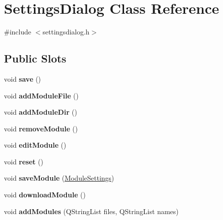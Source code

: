 \hypertarget{classSettingsDialog}{
\section{SettingsDialog Class Reference}
\label{classSettingsDialog}
}


{\ttfamily \#include $<$settingsdialog.h$>$}\subsection*{Public Slots}
\begin{DoxyCompactItemize}
\item 
\hypertarget{classSettingsDialog_adea5c3242cbad78dfc8d9948d2a265de}{
void {\bfseries save} ()}
\label{classSettingsDialog_adea5c3242cbad78dfc8d9948d2a265de}

\item 
\hypertarget{classSettingsDialog_a081503f4834e7a8ce54ac2d01f9b61b2}{
void {\bfseries addModuleFile} ()}
\label{classSettingsDialog_a081503f4834e7a8ce54ac2d01f9b61b2}

\item 
\hypertarget{classSettingsDialog_a5416feca0f8183ab304c5c484a2e69b1}{
void {\bfseries addModuleDir} ()}
\label{classSettingsDialog_a5416feca0f8183ab304c5c484a2e69b1}

\item 
\hypertarget{classSettingsDialog_ae27991e987832e86da7dc05621a9e400}{
void {\bfseries removeModule} ()}
\label{classSettingsDialog_ae27991e987832e86da7dc05621a9e400}

\item 
\hypertarget{classSettingsDialog_a76fa3919cf0f15111e375833ece48517}{
void {\bfseries editModule} ()}
\label{classSettingsDialog_a76fa3919cf0f15111e375833ece48517}

\item 
\hypertarget{classSettingsDialog_a51de698192c7c809e92221fcbffaf642}{
void {\bfseries reset} ()}
\label{classSettingsDialog_a51de698192c7c809e92221fcbffaf642}

\item 
\hypertarget{classSettingsDialog_a81e0592cf638ac19d0a91f08c3b98df6}{
void {\bfseries saveModule} (\hyperlink{classModuleSettings}{ModuleSettings})}
\label{classSettingsDialog_a81e0592cf638ac19d0a91f08c3b98df6}

\item 
\hypertarget{classSettingsDialog_a14cc2b79fda96032f2e1ca626b6e3efc}{
void {\bfseries downloadModule} ()}
\label{classSettingsDialog_a14cc2b79fda96032f2e1ca626b6e3efc}

\item 
\hypertarget{classSettingsDialog_a2b94d87ae080b290631d3379b9e9bf58}{
void {\bfseries addModules} (QStringList files, QStringList names)}
\label{classSettingsDialog_a2b94d87ae080b290631d3379b9e9bf58}

\end{DoxyCompactItemize}
